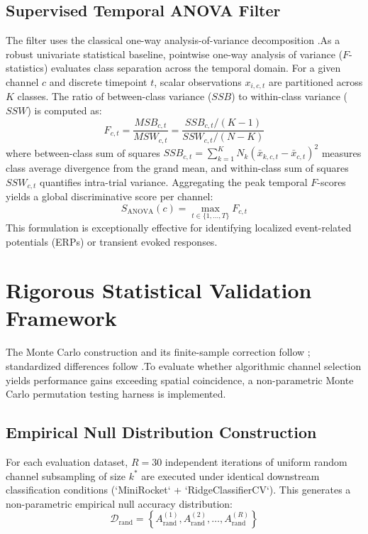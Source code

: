 \subsection{Supervised Temporal ANOVA Filter}
\noindent
The filter uses the classical one-way analysis-of-variance decomposition
\citep{fisher1925anova}.As a robust univariate statistical baseline, pointwise one-way analysis of variance ($F$-statistics) evaluates class separation across the temporal domain. For a given channel $c$ and discrete timepoint $t$, scalar observations $x_{i, c, t}$ are partitioned across $K$ classes. The ratio of between-class variance ($SSB$) to within-class variance ($SSW$) is computed as:
\begin{equation}
    F_{c, t} = \frac{MSB_{c, t}}{MSW_{c, t}} = \frac{SSB_{c, t} / (K - 1)}{SSW_{c, t} / (N - K)}
\end{equation}
where between-class sum of squares $SSB_{c, t} = \sum_{k=1}^K N_k \left( \bar{x}_{k, c, t} - \bar{x}_{c, t} \right)^2$ measures class average divergence from the grand mean, and within-class sum of squares $SSW_{c, t}$ quantifies intra-trial variance. Aggregating the peak temporal $F$-scores yields a global discriminative score per channel:
\begin{equation}
    S_{\text{ANOVA}}(c) = \max_{t \in \{1, \dots, T\}} F_{c, t}
\end{equation}
This formulation is exceptionally effective for identifying localized event-related potentials (ERPs) or transient evoked responses.

\section{Rigorous Statistical Validation Framework}
\label{sec:statistical_validation}

\noindent
The Monte Carlo construction and its finite-sample correction follow
\citet{good2005permutation,north2002permutation,
phipson2010permutation}; standardized differences follow
\citet{cohen1988power}.To evaluate whether algorithmic channel selection yields performance gains exceeding spatial coincidence, a non-parametric Monte Carlo permutation testing harness is implemented.

\subsection{Empirical Null Distribution Construction}
\noindent
For each evaluation dataset, $R = 30$ independent iterations of uniform random channel subsampling of size $k^*$ are executed under identical downstream classification conditions (`MiniRocket` + `RidgeClassifierCV`). This generates a non-parametric empirical null accuracy distribution:
\begin{equation}
    \mathcal{D}_{\text{rand}} = \left\{ A_{\text{rand}}^{(1)}, A_{\text{rand}}^{(2)}, \dots, A_{\text{rand}}^{(R)} \right\}
\end{equation}

